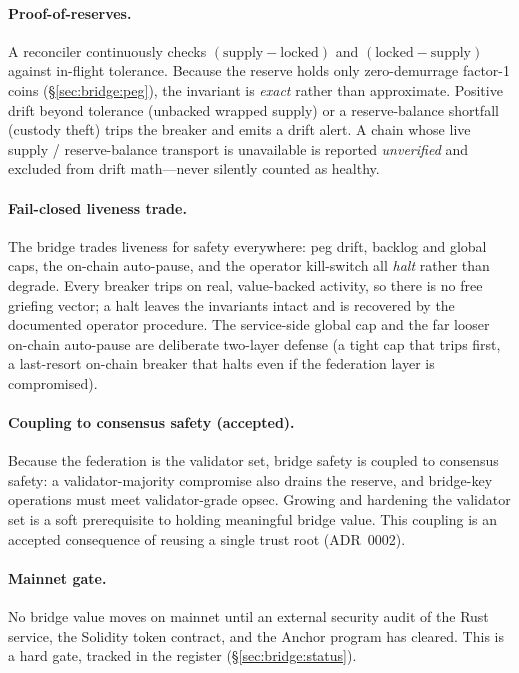 \paragraph{Proof-of-reserves.} A reconciler continuously checks
$(\text{supply} - \text{locked})$ and $(\text{locked} - \text{supply})$ against
in-flight tolerance. Because the reserve holds only zero-demurrage factor-1
coins (\S\ref{sec:bridge:peg}), the invariant is \emph{exact} rather than
approximate. Positive drift beyond tolerance (unbacked wrapped supply) or a
reserve-balance shortfall (custody theft) trips the breaker and emits a drift
alert. A chain whose live supply / reserve-balance transport is unavailable is
reported \emph{unverified} and excluded from drift math---never silently counted
as healthy.

\paragraph{Fail-closed liveness trade.} The bridge trades liveness for safety
everywhere: peg drift, backlog and global caps, the on-chain auto-pause, and the
operator kill-switch all \emph{halt} rather than degrade. Every breaker trips on
real, value-backed activity, so there is no free griefing vector; a halt leaves
the invariants intact and is recovered by the documented operator procedure. The
service-side global cap and the far looser on-chain auto-pause are deliberate
two-layer defense (a tight cap that trips first, a last-resort on-chain breaker
that halts even if the federation layer is compromised).

\paragraph{Coupling to consensus safety (accepted).} Because the federation is
the validator set, bridge safety is coupled to consensus safety: a
validator-majority compromise also drains the reserve, and bridge-key operations
must meet validator-grade opsec. Growing and hardening the validator set is a
soft prerequisite to holding meaningful bridge value. This coupling is an
accepted consequence of reusing a single trust root (ADR~0002).

\paragraph{Mainnet gate.} No bridge value moves on mainnet until an external
security audit of the Rust service, the Solidity token contract, and the Anchor
program has cleared. This is a hard gate, tracked in the register
(\S\ref{sec:bridge:status}).

